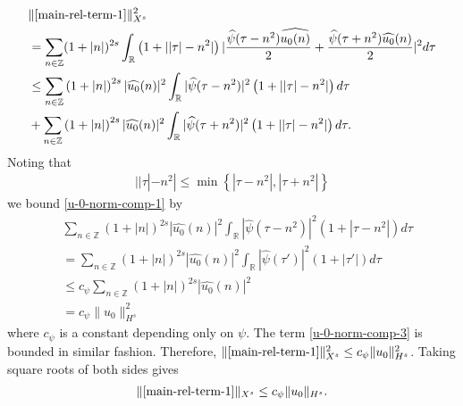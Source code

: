 \documentclass[12pt,reqno]{amsart}
\numberwithin{equation}{section}  %
\numberwithin{figure}{section}
\newcommand{\rr}{\mathbb{R}}
\newcommand{\zz}{\mathbb{Z}}
\newcommand{\wh}{\widehat}
\theoremstyle{plain}
\theoremstyle{definition}
\theoremstyle{remark}
\begin{document}
%
%
\begin{align}
  & \| \eqref{main-rel-term-1} \|_{X^{s}}^{2} 
    \notag
    \\
    & = \sum_{n \in \zz}(1 + |n|)^{2s} \int_{\rr}\left( 1 + | | \tau
    |-n^{2} | \right) | \frac{\wh{\psi}(\tau - n^{2})\wh{u_{0}(n)}}{2 } +
    \frac{\wh{\psi}(\tau + n^{2})\wh{u_{0}}(n)}{2 } |^{2} d \tau
    \notag
    \\
    & \le \sum_{n \in \zz} \left( 1 + |n| \right)^{2s} | \wh{u_{0}}(n)
    |^{2} \int_{\rr} | \wh{\psi}(\tau - n^{2}) |^{2}\left( 1 + | | \tau | -
    n^{2} | \right) d \tau
    \label{u-0-norm-comp-1}
    \\
    & + \sum_{n \in \zz} \left( 1 + |n| \right)^{2s} | \wh{u_{0}}(n)
    |^{2} \int_{\rr} | \wh{\psi}(\tau + n^{2}) |^{2}\left( 1 + | | \tau | -
    n^{2} | \right) d \tau.
    \label{u-0-norm-comp-3}
\end{align}
%
Noting that
\begin{equation}
  \begin{split}
    | | \tau | - n^{2} | \le \min\left\{ | \tau - n^{2} |, | \tau + n^{2} | \right\}
  \end{split}
  \label{eqn:norm-key-ineq}
\end{equation}
%
%
we bound \eqref{u-0-norm-comp-1} by
%
%
\begin{equation*}
  \begin{split}
    & \sum_{n \in \zz} \left( 1 + |n| \right)^{2s} | \wh{u_{0}}(n)
    |^{2} \int_{\rr} | \wh{\psi}(\tau - n^{2}) |^{2}\left( 1 +  | \tau  -
    n^{2} | \right) d \tau
    \\
    & = \sum_{n \in \zz} \left( 1 + |n| \right)^{2s} | \wh{u_{0}}(n)
    |^{2} \int_{\rr} | \wh{\psi}(\tau') |^{2}\left( 1 +  | \tau'| \right) d \tau
    \\
    & \le c_{\psi} \sum_{n \in \zz} \left( 1 + |n| \right)^{2s} | \wh{u_{0}}(n)
    |^{2}
    \\
    & = c_{\psi} \| u_{0} \|_{H^{s}}^{2}
  \end{split}
\end{equation*}
%
%
where $c_{\psi}$ is a constant depending only on $\psi$. The
term \eqref{u-0-norm-comp-3} is bounded in similar fashion. Therefore, 
$\|\eqref{main-rel-term-1}\|_{X^{s}}^{2} \le c_{\psi}
\|u_{0}\|_{H^s}^2$. Taking square roots of both sides gives
%
%
\begin{equation}
  \begin{split}
    \|\eqref{main-rel-term-1}\|_{X^{s}} \le c_{\psi}
    \|u_{0}\|_{H^s}.
  \end{split}
  \label{eqn:u-0-fin-est}
\end{equation}
%
%
%
%
\end{document}
